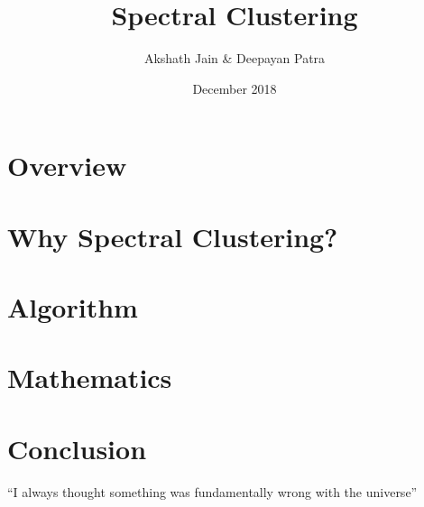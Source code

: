 \documentclass{article}
\title{Spectral Clustering}
\author{Akshath Jain & Deepayan Patra}
\date{December 2018}
\begin{document}
\maketitle\cr

\section{Overview}

\section{Why Spectral Clustering?}

\section{Algorithm}

\section{Mathematics}

\section{Conclusion}
``I always thought something was fundamentally wrong with the universe'' 



\end{document}
